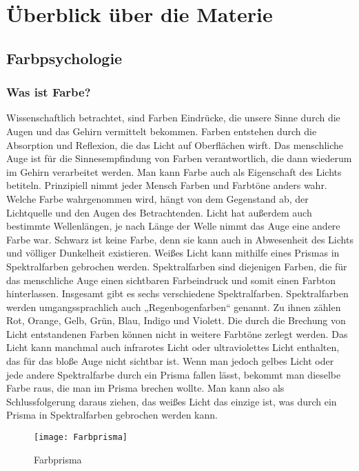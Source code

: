 \chapter{Überblick über die Materie}

\section{Farbpsychologie}

\subsection{Was ist Farbe?}
Wissenschaftlich betrachtet, sind Farben Eindrücke, die unsere Sinne durch die Augen und das Gehirn vermittelt bekommen. Farben entstehen durch die Absorption und Reflexion, die das Licht auf Oberflächen wirft. Das menschliche Auge ist für die Sinnesempfindung von Farben verantwortlich, die dann wiederum im Gehirn verarbeitet werden. Man kann Farbe auch als Eigenschaft des Lichts betiteln. Prinzipiell nimmt jeder Mensch Farben und Farbtöne anders wahr. Welche Farbe wahrgenommen wird, hängt von dem Gegenstand ab, der Lichtquelle und den Augen des Betrachtenden. Licht hat außerdem auch bestimmte Wellenlängen, je nach Länge der Welle nimmt das Auge eine andere Farbe war. Schwarz ist keine Farbe, denn sie kann auch in Abwesenheit des Lichts und völliger Dunkelheit existieren.
Weißes Licht kann mithilfe eines Prismas in Spektralfarben gebrochen werden. Spektralfarben sind diejenigen Farben, die für das menschliche Auge einen sichtbaren Farbeindruck und somit einen Farbton hinterlassen. Insgesamt gibt es sechs verschiedene Spektralfarben. Spektralfarben werden umgangssprachlich auch „Regenbogenfarben“ genannt. Zu ihnen zählen Rot, Orange, Gelb, Grün, Blau, Indigo und Violett. Die durch die Brechung von Licht entstandenen Farben können nicht in weitere Farbtöne zerlegt werden. Das Licht kann manchmal auch infrarotes Licht oder ultraviolettes Licht enthalten, das für das bloße Auge nicht sichtbar ist.
Wenn man jedoch gelbes Licht oder jede andere Spektralfarbe durch ein Prisma fallen lässt, bekommt man dieselbe Farbe raus, die man im Prisma brechen wollte. Man kann also als Schlussfolgerung daraus ziehen, das weißes Licht das einzige ist, was durch ein Prisma in Spektralfarben gebrochen werden kann.
\cite{mollica2018special}

\begin{figure}[H]
	\centering
	\texttt{[image: Farbprisma]}
	\caption{Farbprisma\cite{_basicColorTheory}}
\end{figure}

